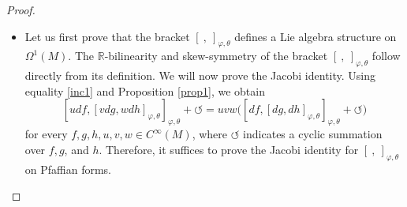 \documentclass[10pt,a4paper]{amsart}
\begin{document}
		\begin{proof}~
			\begin{itemize}
				\item Let us first prove that the bracket $[\ ,\ ]_{\varphi,\theta}$ defines a Lie algebra structure on $\Omega^1(M)$.
				The $\mathbb{R}$-bilinearity and skew-symmetry of the bracket $[\ ,\ ]_{\varphi,\theta}$ follow directly from its definition.
				We will now prove the Jacobi identity. Using equality \eqref{inc1} and Proposition \ref{prop1}, we obtain
				$$
				 [udf,[vdg,wdh]_{\varphi,\theta}]_{\varphi,\theta}+\circlearrowleft=uvw\big([df,[dg,dh]_{\varphi,\theta}]_{\varphi,\theta}+\circlearrowleft\big)
				$$
				for every $f,g,h,u,v,w\in C^\infty(M)$, where $\circlearrowleft$ indicates a cyclic summation over $f, g$, and $h$. Therefore, it suffices to prove the Jacobi identity for $[\ ,\ ]_{\varphi,\theta}$ on Pfaffian forms.
				

\end{itemize}
\end{proof}
\end{document}
